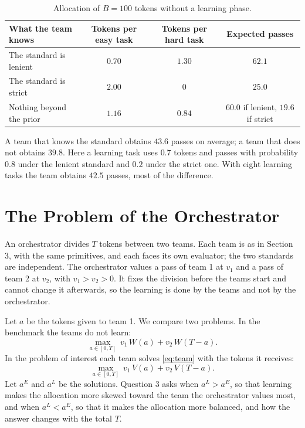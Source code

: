 \documentclass[11pt]{article}
\begin{document}
\begin{table}[htbp]
\centering
\small
\begin{tabular}{@{}lccc@{}}
\toprule
What the team knows & Tokens per easy task & Tokens per hard task & Expected passes \\
\midrule
The standard is lenient & $0.70$ & $1.30$ & $62.1$ \\
The standard is strict & $2.00$ & $0$ & $25.0$ \\
Nothing beyond the prior & $1.16$ & $0.84$ & $60.0$ if lenient, $19.6$ if strict \\
\bottomrule
\end{tabular}
\caption{Allocation of $B=100$ tokens without a learning phase.}
\label{tab:example}
\end{table}

A team that knows the standard obtains $43.6$ passes on average; a team that does not obtains $39.8$. Here a learning task uses $0.7$ tokens and passes with probability $0.8$ under the lenient standard and $0.2$ under the strict one. With eight learning tasks the team obtains $42.5$ passes, most of the difference.

\section{The Problem of the Orchestrator}\label{sec:orch}

An orchestrator divides $T$ tokens between two teams. Each team is as in Section 3, with the same primitives, and each faces its own evaluator; the two standards are independent. The orchestrator values a pass of team 1 at $v_1$ and a pass of team 2 at $v_2$, with $v_1>v_2>0$. It fixes the division before the teams start and cannot change it afterwards, so the learning is done by the teams and not by the orchestrator.

Let $a$ be the tokens given to team 1. We compare two problems. In the benchmark the teams do not learn:
\begin{equation}\label{eq:E}
\max_{a\in[0,T]}\ v_1\,W(a)+v_2\,W(T-a).
\end{equation}
In the problem of interest each team solves \eqref{eq:team} with the tokens it receives:
\begin{equation}\label{eq:L}
\max_{a\in[0,T]}\ v_1\,V(a)+v_2\,V(T-a).
\end{equation}
Let $a^E$ and $a^L$ be the solutions. Question 3 asks when $a^L>a^E$, so that learning makes the allocation more skewed toward the team the orchestrator values most, and when $a^L<a^E$, so that it makes the allocation more balanced, and how the answer changes with the total $T$.
\end{document}
